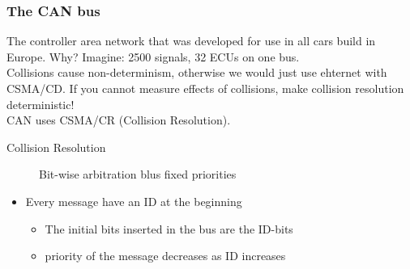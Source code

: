 \documentclass[course, english]{Notes}
\begin{document}
\subsubsection{The CAN bus}
The controller area network that was developed for use in all cars build in
Europe. Why? Imagine: 2500 signals, 32 ECUs on one bus.\\
Collisions cause non-determinism, otherwise we would just use ehternet with
CSMA/CD. If you cannot measure effects of collisions, make collision resolution
deterministic!\\
CAN uses CSMA/CR (Collision Resolution). 
\begin{description}
	\item[Collision Resolution] Bit-wise arbitration blus fixed priorities
\end{description}
\begin{itemize}
	\item Every message have an ID at the beginning
		\begin{itemize}
			\item The initial bits inserted in the bus are the
				ID-bits
			\item priority of the message decreases as ID increases
		\end{itemize}
\end{itemize}
\end{document}
